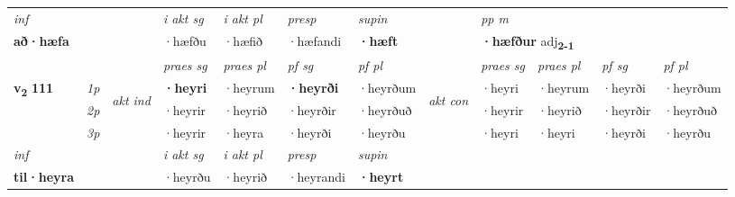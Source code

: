 \begin{longtable}[l]{X>{\footnotesize\itshape}llXXXXlXXXX}
   {\textit{inf}} & &  & \textit{i akt sg} & \textit{i akt pl}   & \textit{presp} & \textit{supin}  && \textit{pp m} \\*
  {\textbf{að\allowbreak ·hæfa}} & && ·hæfðu  & ·hæfið   & ·hæfandi &  \textbf{·hæft}  && \multicolumn{2}{l}{\textbf{·hæfður} adj\textbf{\textsubscript{2-1}}} \\*

\midrule

 & &   & \textit{praes sg}  & \textit{praes pl}    & \textit{ pf sg} & \textit{pf pl} & & \textit{praes sg}  & \textit{praes pl}    & \textit{pf sg} & \textit{pf pl }  \\ \cmidrule{4-7} \cmidrule{9-12}
 \multirow{2}{*}{{{\textbf{v{\textsubscript{2}}} \Large{\textbf{111}}}}}  & 1p & \multirow{3}{*}{\begin{turn}{90}\textit{akt ind}\end{turn}} & \textbf{·heyri} & ·heyrum & \textbf{·heyrði} & ·heyrðum & \multirow{3}{*}{\begin{turn}{90}\textit{akt con}\end{turn}} &·heyri & ·heyrum & ·heyrði & ·heyrðum\\*
 & 2p &  &  ·heyrir  & ·heyrið & ·heyrðir & ·heyrðuð & & ·heyrir & ·heyrið & ·heyrðir & ·heyrðuð \\*
 & 3p &  & ·heyrir & ·heyra & ·heyrði & ·heyrðu & & ·heyri & ·heyri& ·heyrði & ·heyrðu \\*
\cmidrule{4-7} \cmidrule{9-12}

   {\textit{inf}} & &  & \textit{i akt sg} & \textit{i akt pl}   & \textit{presp} & \textit{supin}   \\*
  {\textbf{til\allowbreak ·heyra}} & && ·heyrðu  & ·heyrið   & ·heyrandi &  \textbf{·heyrt}   \\*

\midrule


\end{longtable}

